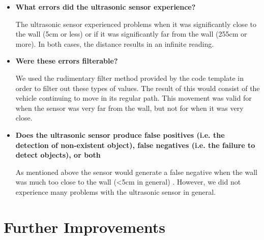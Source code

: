 \documentclass[paper=a4, fontsize=11pt]{scrartcl}
\begin{document}
\begin{itemize}

  \item \textbf{What errors did the ultrasonic sensor experience?}
  
  The ultrasonic sensor experienced problems when it was significantly close to the wall (5cm or less) or if it was significantly far from the wall (255cm or more). In both cases, the distance results in an infinite reading. 
  
  \item \textbf{Were these errors filterable?}
  
  We used the rudimentary filter method provided by the code template in order to filter out these types of values. The result of this would consist of the vehicle continuing to move in its regular path. This movement was valid for when the sensor was very far from the wall, but not for when it was very close.
  
  \item \textbf{Does the ultrasonic sensor produce false positives (i.e. the detection of non-existent object), false negatives (i.e. the failure to detect objects), or both}
  
  As mentioned above the sensor would generate a false negative when the wall was much too close to the wall (<5cm in general) . However, we did not experience many problems with the ultrasonic sensor in general. 
  
\end{itemize}


\section{Further Improvements}
\end{document}
